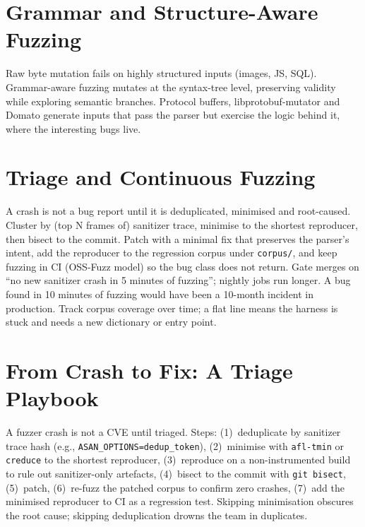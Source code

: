 \section{Grammar and Structure-Aware Fuzzing}
\label{sec:grammar-fuzz}
Raw byte mutation fails on highly structured inputs (images, JS, SQL). Grammar-aware fuzzing mutates at the syntax-tree level, preserving validity while exploring semantic branches. Protocol buffers, libprotobuf-mutator and Domato generate inputs that pass the parser but exercise the logic behind it, where the interesting bugs live.

\section{Triage and Continuous Fuzzing}
\label{sec:triage}
{\sloppy
A crash is not a bug report until it is deduplicated, minimised and root-caused. Cluster by (top N frames of) sanitizer trace, minimise to the shortest reproducer, then bisect to the commit. Patch with a minimal fix that preserves the parser's intent, add the reproducer to the regression corpus under \texttt{corpus/}, and keep fuzzing in CI (OSS-Fuzz model) so the bug class does not return. Gate merges on ``no new sanitizer crash in 5 minutes of fuzzing''; nightly jobs run longer. A bug found in 10 minutes of fuzzing would have been a 10-month incident in production. Track corpus coverage over time; a flat line means the harness is stuck and needs a new dictionary or entry point.
\par}

\section{From Crash to Fix: A Triage Playbook}
\label{sec:fix-playbook}
{\sloppy
A fuzzer crash is not a CVE until triaged. Steps: (1)~deduplicate by sanitizer trace hash (e.g., \texttt{ASAN\_OPTIONS=}\texttt{dedup\_token}), (2)~minimise with \texttt{afl-tmin} or \texttt{creduce} to the shortest reproducer, (3)~reproduce on a non-instrumented build to rule out sanitizer-only artefacts, (4)~bisect to the commit with \texttt{git bisect}, (5)~patch, (6)~re-fuzz the patched corpus to confirm zero crashes, (7)~add the minimised reproducer to CI as a regression test. Skipping minimisation obscures the root cause; skipping deduplication drowns the team in duplicates.
\par}



